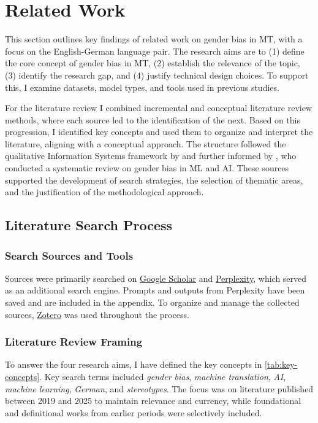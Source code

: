 \chapter{Related Work}

This section outlines key findings of related work on gender bias in MT, with a focus on the English-German language pair. The research aims are to (1) define the core concept of gender bias in MT, (2) establish the relevance of the topic, (3) identify the research gap, and (4) justify technical design choices. To support this, I examine datasets, model types, and tools used in previous studies.

For the literature review I combined incremental and conceptual literature review methods, where each source led to the identification of the next. Based on this progression, I identified key concepts and used them to organize and interpret the literature, aligning with a conceptual approach. The structure followed the qualitative Information Systems framework by \citet{schryenWritingQualitativeLiterature2015} and further informed by \citet{shresthaExploringGenderBiases2022}, who conducted a systematic review on gender bias in ML and AI. These sources supported the development of search strategies, the selection of thematic areas, and the justification of the methodological approach.


\section{Literature Search Process}

\subsection{Search Sources and Tools}
Sources were primarily searched on \href{https://scholar.google.com/}{Google Scholar} and \href{https://www.perplexity.ai/}{Perplexity}, which served as an additional search engine. Prompts and outputs from Perplexity have been saved and are included in the appendix. To organize and manage the collected sources, \href{https://www.zotero.org/}{Zotero} was used throughout the process.

\subsection{Literature Review Framing}

To answer the four research aims, I have defined the key concepts in \autoref{tab:key-concepts}. Key search terms included \textit{gender bias}, \textit{machine translation}, \textit{AI}, \textit{machine learning}, \textit{German}, and \textit{stereotypes}. The focus was on literature published between 2019 and 2025 to maintain relevance and currency, while foundational and definitional works from earlier periods were selectively included.

